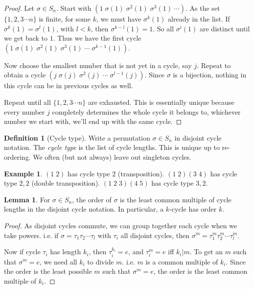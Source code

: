 \documentclass[a4paper]{article}
\theoremstyle{definition}
\newtheorem*{defi}{Definition}
\newtheorem*{eg}{Example}
\newtheorem*{lemma}{Lemma}
\begin{document}
\begin{proof}
  Let $\sigma\in S_n$. Start with $(1\; \sigma(1)\; \sigma^2(1)\; \sigma^3(1)\;\cdots)$. As the set $\{1, 2, 3\cdots n\}$ is finite, for some $k$, we must have $\sigma^k(1)$ already in the list. If $\sigma^k(1) = \sigma^l(1)$, with $l < k$, then $\sigma^{k-l}(1) = 1$. So all $\sigma^i(1)$ are distinct until we get back to $1$. Thus we have the first cycle $(1\; \sigma(1)\; \sigma^2(1)\; \sigma^3(1)\;\cdots\;\sigma^{k-1}(1))$.

Now choose the smallest number that is not yet in a cycle, say $j$. Repeat to obtain a cycle $(j\; \sigma(j)\; \sigma^2(j)\;\cdots\; \sigma^{l - 1}(j))$. Since $\sigma$ is a bijection, nothing in this cycle can be in previous cycles as well.

Repeat until all $\{1, 2, 3\cdots n\}$ are exhausted. This is essentially unique because every number $j$ completely determines the whole cycle it belongs to, whichever number we start with, we'll end up with the same cycle.
\end{proof}

\begin{defi}[Cycle type]
  Write a permutation $\sigma\in S_n$ in disjoint cycle notation. The \emph{cycle type} is the list of cycle lengths. This is unique up to re-ordering. We often (but not always) leave out singleton cycles.
\end{defi}
\begin{eg}
  $(1\; 2)$ has cycle type $2$ (transposition). $(1\; 2)(3\; 4)$ has cycle type $2, 2$ (double transposition). $(1\; 2\; 3)(4\; 5)$ has cycle type $3, 2$.
\end{eg}
\begin{lemma}
  For $\sigma\in S_n$, the order of $\sigma$ is the least common multiple of cycle lengths in the disjoint cycle notation. In particular, a $k$-cycle has order $k$.
\end{lemma}

\begin{proof}
  As disjoint cycles commute, we can group together each cycle when we take powers. i.e. if $\sigma = \tau_1\tau_2\cdots\tau_l$ with $\tau_i$ all disjoint cycles, then $\sigma^m = \tau_1^m\tau_2^m\cdots\tau_l^m$.

Now if cycle $\tau_i$ has length $k_i$, then $\tau_i^{k_i} = e$, and $\tau_i^m = e$ iff $k_i | m$. To get an $m$ such that $\sigma^m = e$, we need all $k_i$ to divide $m$. i.e. $m$ is a common multiple of $k_i$. Since the order is the least possible $m$ such that $\sigma^m = e$, the order is the least common multiple of $k_i$.
\end{proof}
\end{document}
